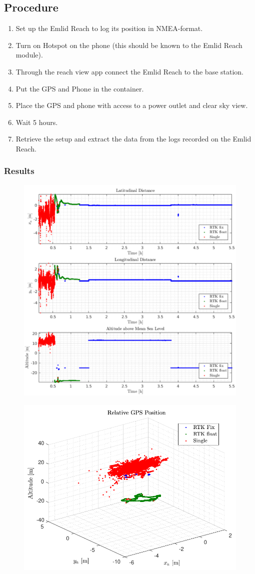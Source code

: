 \subsection*{Procedure}
\begin{enumerate}
  \item Set up the Emlid Reach to log its position in NMEA-format.
	\item Turn on Hotspot on the phone (this should be known to the Emlid Reach module).
	\item Through the reach view app connect the Emlid Reach to the base station.
	\item Put the GPS and Phone in the container.
	\item Place the GPS and phone with access to a power outlet and clear sky view.
	\item Wait 5 hours.
	\item Retrieve the setup and extract the data from the logs recorded on the Emlid Reach.
\end{enumerate}

\subsubsection*{Results}

\begin{figure}[H]
  \captionbox
  {
    
    \label{fig:GPS_2DPlot}
  }
  {
    \includegraphics[width=.45\textwidth]{figures/GPS_2DPlot}
  }
  \hspace{5pt}
  \captionbox
  {
    
    \label{fig:GPS_3DPlot}
  }
  {
    \includegraphics[width=.45\textwidth]{figures/GPS_3DPlot}
  }
\end{figure}

